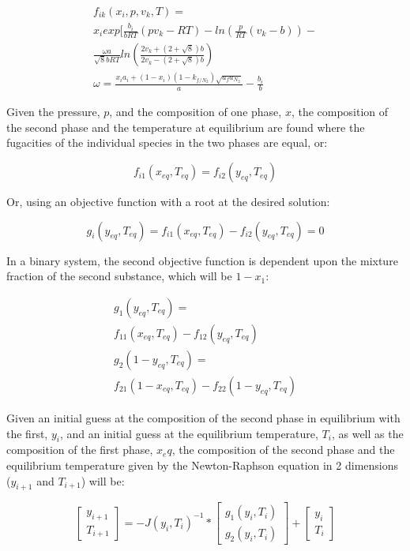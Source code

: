 \documentclass[a4paper, twocolumn]{article}
\begin{document}
\begin{gather} \label{eq1}
f_{ik}(x_i, p, v_k, T)  =  \nonumber\\
x_i exp[\frac{b_i}{bRT}\left(pv_k-RT\right)-ln\left(\frac{p}{RT}(v_k-b)\right)  - \nonumber\\
 \frac{\omega a}{\sqrt{8}bRT}ln\left(\frac{2v_k  + (2+\sqrt{8})b}{2v_k  - (2+\sqrt{8})b}\right)\\
\omega=\frac{x_i a_i + (1-x_i)(1-k_{f/N_2})\sqrt{a_f a_{N_2}}}{a} - \frac{b_i}{b}\nonumber
\end{gather}

Given the pressure, $p$, and the composition of one phase, $x$, the composition of the second phase and the temperature at equilibrium are found where the fugacities of the individual species in the two phases are equal, or:

\begin{equation}
f_{i1}(x_{eq}, T_{eq}) = f_{i2}(y_{eq}, T_{eq})
\end{equation}

Or, using an objective function with a root at the desired solution:

\begin{equation}
g_i(y_{eq}, T_{eq}) = f_{i1}(x_{eq}, T_{eq}) - f_{i2}(y_{eq}, T_{eq}) = 0
\end{equation}

In a binary system, the second objective function is dependent upon the mixture fraction of the second substance, which will be $1-x_1$:

\begin{gather}
g_1(y_{eq}, T_{eq}) = \nonumber\\
f_{11}(x_{eq}, T_{eq}) - f_{12}(y_{eq}, T_{eq}) \\
g_2(1-y_{eq}, T_{eq}) = \nonumber\\
f_{21}(1-x_{eq}, T_{eq}) - f_{22}(1-y_{eq}, T_{eq}) 
\end{gather}

Given an initial guess at the composition of the second phase in equilibrium with the first, $y_i$, and an initial guess at the equilibrium temperature, $T_{i}$, as well as the composition of the first phase, $x_eq$, the composition of the second phase and the equilibrium temperature given by the Newton-Raphson equation in 2 dimensions  ($y_{i+1}$ and $T_{i+1}$) will be:

\[\begin{bmatrix}y_{i+1}\\T_{i+1}\end{bmatrix} = -J(y_i, T_i)^{-1}*\begin{bmatrix}g_1(y_i, T_i)\\g_2(y_i, T_i)\end{bmatrix} + \begin{bmatrix}y_i\\T_i\end{bmatrix}\]
\end{document}
